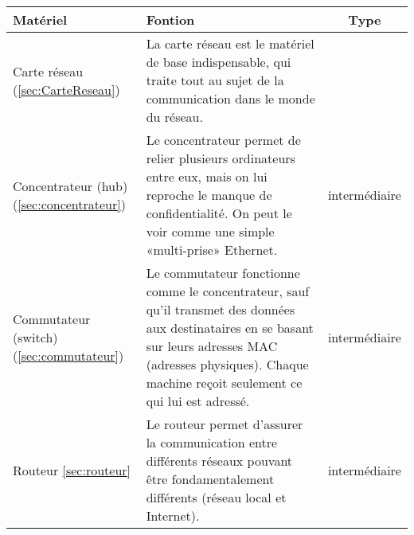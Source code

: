 \begin{tabular}{p{}|p{}|c}
  \textbf{Matériel} & \textbf{Fontion} & \textbf{Type}\\\hline
  Carte réseau (\ref{sec:CarteReseau})          & La carte réseau est le matériel de base indispensable, qui traite tout au sujet de la communication dans le monde du réseau. &  \\\hline

  Concentrateur (hub) (\ref{sec:concentrateur})   & Le concentrateur permet de relier plusieurs ordinateurs entre eux, mais on lui reproche le manque de confidentialité. On peut le voir comme une simple «multi-prise» Ethernet.  & intermédiaire \\\hline

  Commutateur (switch) (\ref{sec:commutateur}) & Le commutateur fonctionne comme le concentrateur, sauf qu'il transmet des données aux destinataires en se basant sur leurs adresses MAC (adresses physiques). Chaque machine reçoit seulement ce qui lui est adressé. & intermédiaire\\\hline

  Routeur \ref{sec:routeur}& Le routeur permet d'assurer la communication entre différents réseaux pouvant être fondamentalement différents (réseau local et Internet). & intermédiaire\\

\end{tabular}

